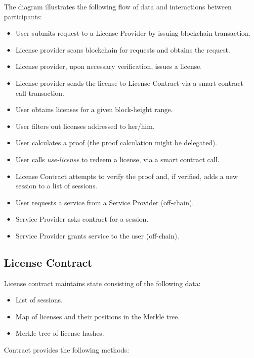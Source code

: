The diagram illustrates the following flow of data and interactions between participants:

\begin{itemize}%
	\item User submits request to a License Provider by issuing blockchain transaction.
	\item License provider scans blockchain for requests and obtains the request.
	\item License provider, upon necessary verification, issues a license.
	\item License provider sends the license to License Contract via a smart contract call transaction.
	\item User obtains licenses for a given block-height range.
	\item User filters out licenses addressed to her/him.
	\item User calculates a proof (the proof calculation might be delegated).
	\item User calls \textit{use-license} to redeem a license, via a smart contract call.
	\item License Contract attempts to verify the proof and, if verified, adds a new session to a list of sessions.
	\item User requests a service from a Service Provider (off-chain).
	\item Service Provider asks contract for a session.
	\item Service Provider grants service to the user (off-chain).
\end{itemize}


\subsection{License Contract}

\begin{flushleft}
License contract maintains state consisting of the following data:
\end{flushleft}

\begin{itemize}%
	\item List of sessions.
	\item Map of licenses and their positions in the Merkle tree.
	\item Merkle tree of license hashes.
\end{itemize}


\begin{flushleft}
Contract provides the following methods:
\end{flushleft}

